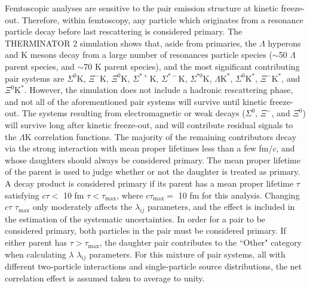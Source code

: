 \documentclass[ALICE,manyauthors]{cernphprep}
\newcommand{\Lam}{$\Lambda$\xspace}
\newcommand{\LamK}{$\Lambda$K\xspace}
\begin{document}
Femtoscopic analyses are sensitive to the pair emission structure at kinetic freeze-out.
Therefore, within femtoscopy, any particle which originates from a {\color{red}resonance} {\color{blue}particle} decay before last rescattering is considered primary.
The THERMINATOR 2 simulation shows that{\color{red}, aside from primaries,} the \Lam hyperons and K mesons decay from a large number of {\color{red}resonances} {\color{blue}particle species} ($\sim$50 \Lam parent species, and $\sim$70 K parent species), and the most significant contributing pair systems are $\Sigma^{0}$K, $\Xi^{-}$K, $\Xi^{0}$K, $\Sigma^{*+}$K, $\Sigma^{*-}$K, $\Sigma^{*0}$K, $\Lambda\mathrm{K}^{*}$, $\Sigma^{0}\mathrm{K}^{*}$, $\Xi^{-}\mathrm{K}^{*}$, and $\Xi^{0}\mathrm{K}^{*}$.
However, the simulation does not include a hadronic rescattering phase, and not all of the aforementioned pair systems will survive until kinetic freeze-out.
The systems resulting from electromagnetic or weak decays ($\Sigma^{0}$, $\Xi^{-}$, and $\Xi^{0}$) will survive long after kinetic freeze-out, and will contribute residual signals to the \LamK correlation functions.
The majority of the remaining contributors decay via the strong interaction with mean proper lifetimes less than a few fm/$c$, and whose daughters should always be considered primary.
The mean proper lifetime of the parent is used to judge whether or not the daughter is treated as primary.
A decay product is considered primary if its parent has a mean proper lifetime $\tau$ satisfying {\color{red}$c\tau <$ 10 fm} {\color{blue}$\tau < \tau_{\mathrm{max}}$, where $c\tau_{\mathrm{max}} =$ 10 fm for this analysis}.
Changing {\color{red}$c\tau$} {\color{blue}$\tau_{\mathrm{max}}$} only moderately affects the $\lambda_{ij}$ parameters, and the effect is included in the estimation of the systematic uncertainties.
In order for a pair to be considered primary, both particles in the pair must be considered primary. 
If either parent has $\tau > \tau_{\mathrm{max}}$, the daughter pair contributes to the ``Other" category when calculating {\color{red}$\lambda$} {\color{blue}$\lambda_{ij}$} parameters.
For this mixture of pair systems, all with different two-particle interactions and single-particle source distributions, the net correlation effect is {\color{red}assumed} {\color{blue}taken} to average to unity.
\end{document}
